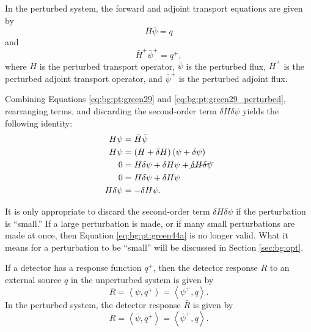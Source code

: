 In the perturbed system, the forward and adjoint transport equations are given by
\begin{equation}\label{eq:bg:pt:green29_perturbed}
  \bar{H}\bar{\psi} = q
\end{equation}
and
\begin{equation}\label{eq:bg:pt:green163_perturbed}
  \bar{H}^+\bar{\psi}^+ = q^+,
\end{equation}
where $\bar{H}$ is the perturbed transport operator, $\bar{\psi}$ is the perturbed flux, $\bar{H}^+$ is the perturbed adjoint transport operator, and $\bar{\psi}^+$ is the perturbed adjoint flux.

Combining Equations \ref{eq:bg:pt:green29} and \ref{eq:bg:pt:green29_perturbed}, rearranging terms, and discarding the second-order term $\delta H\delta\psi$ yields the following identity:
\begin{equation}\label{eq:bg:pt:green44a}\begin{split}
  H\psi       & = \bar{H}\bar{\psi} \\
  H\psi       & = \left(H+\delta H\right)\left(\psi+\delta\psi\right) \\
  0           & = H\delta\psi + \delta H\psi + \cancel{\delta H\delta\psi} \\
  0           & = H\delta\psi + \delta H\psi \\
  H\delta\psi & = -\delta H\psi.
\end{split}\end{equation}

It is only appropriate to discard the second-order term $\delta H\delta\psi$ if the perturbation is ``small.''
If a large perturbation is made, or if many small perturbations are made at once, then Equation \ref{eq:bg:pt:green44a} is no longer valid.
What it means for a perturbation to be ``small'' will be discussed in Section \ref{sec:bg:opt}.

If a detector has a response function $q^+$, then the detector response $R$ to an external source $q$ in the unperturbed system is given by
\begin{equation}\label{eq:bg:pt:green168}
  R = \left<\psi,q^+\right>
    = \left<\psi^+,q\right>.
\end{equation}
In the perturbed system, the detector response $\bar{R}$ is given by
\begin{equation}\label{eq:bg:pt:r_bar}
  \bar{R} = \left<\bar{\psi},q^+\right>
          = \left<\bar{\psi}^+,q\right>.
\end{equation}

